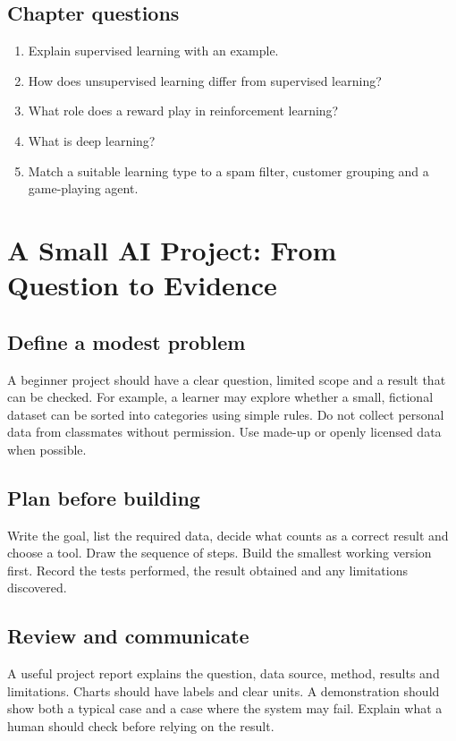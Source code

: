 \documentclass[11pt,openany,oneside]{book}
\begin{document}
\section{Chapter questions}
\begin{enumerate}
\item Explain supervised learning with an example.
\item How does unsupervised learning differ from supervised learning?
\item What role does a reward play in reinforcement learning?
\item What is deep learning?
\item Match a suitable learning type to a spam filter, customer grouping and a game-playing agent.
\end{enumerate}

\chapter{A Small AI Project: From Question to Evidence}
\section{Define a modest problem}
A beginner project should have a clear question, limited scope and a result that can be checked. For example, a learner may explore whether a small, fictional dataset can be sorted into categories using simple rules. Do not collect personal data from classmates without permission. Use made-up or openly licensed data when possible.

\section{Plan before building}
Write the goal, list the required data, decide what counts as a correct result and choose a tool. Draw the sequence of steps. Build the smallest working version first. Record the tests performed, the result obtained and any limitations discovered.

\section{Review and communicate}
A useful project report explains the question, data source, method, results and limitations. Charts should have labels and clear units. A demonstration should show both a typical case and a case where the system may fail. Explain what a human should check before relying on the result.
\end{document}
